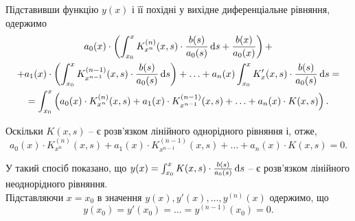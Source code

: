 Підставивши функцію $y(x)$ і її похідні у вихідне диференціальне рівняння, одержимо
\begin{multline*}
	a_0(x) \cdot \left( \int_{x_0}^x K_{x^n}^{(n)} (x, s) \cdot \frac{b(s)}{a_0(s)} \mathop{}\!\mathrm{d} s + \frac{b(x)}{a_0(x)} \right) + \\ + a_1(x) \cdot \left( \int_{x_0}^x K_{x^{n - 1}}^{(n - 1)} (x, s) \cdot \frac{b(s)}{a_0(s)} \mathop{}\!\mathrm{d} s \right) + \ldots + a_n(x) \int_{x_0}^x K_x' (x, s)  \cdot \frac{b(s)}{a_0(s)} \mathop{}\!\mathrm{d} s = \\ = \int_{x_0}^x \left( a_0(x) \cdot K_{x^n}^{(n)}(x, s) + a_1(x) \cdot K_{x^{n - 1}}^{(n - 1)}(x, s) + \ldots + a_n(x) \cdot K(x, s) \right).
\end{multline*}

Оскільки $K(x, s)$ -- є розв’язком лінійного однорідного рівняння і, отже,
\begin{equation*}
	a_0(x) \cdot K_{x^n}^{(n)}(x, s) + a_1(x) \cdot K_{x^{n - 1}}^{(n - 1)}(x, s) + \ldots + a_n(x) \cdot K(x, s) = 0.
\end{equation*}
 
У такий спосіб показано, що $y(x) = \int_{x_0}^x K(x, s) \cdot \frac{b(s)}{a_0(s)} \mathop{}\!\mathrm{d} s$ -- є розв’язком лінійного неоднорідного рівняння. \\

Підставляючи $x = x_0$ в значення $y(x), y'(x), \ldots, y^{(n)}(x)$ одержимо, що
\begin{equation*}
	y(x_0) = y'(x_0) = \ldots = y^{(n - 1)}(x_0) = 0.
\end{equation*}

